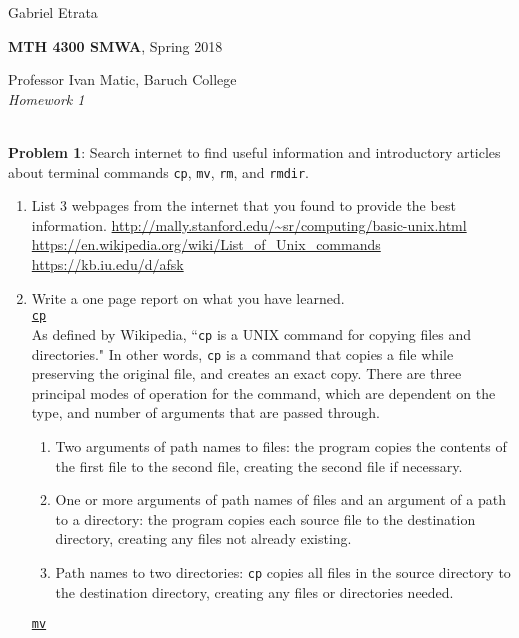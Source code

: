 \documentclass[12pt]{article}
\begin{document}
	\raggedright{Gabriel Etrata} \hfill {}\\
	\raggedright{\textbf{MTH 4300 SMWA}, Spring 2018}\\%
	\raggedright{Professor Ivan Matic, Baruch College}\\
	\textit{Homework 1} \\%
	\hrulefill\\
	\setlength\parindent{24pt} 

\textbf{Problem 1}: Search internet to find useful information and introductory articles about terminal commands \texttt{cp}, \texttt{mv}, \texttt{rm}, and \texttt{rmdir}.
 \begin{enumerate} [label=(\alph*)]
 	\item List 3 webpages from the internet that you found to provide the best information.
 	\url{http://mally.stanford.edu/~sr/computing/basic-unix.html}  \\
 	\url{https://en.wikipedia.org/wiki/List_of_Unix_commands} \\
 	\url{https://kb.iu.edu/d/afsk} \\
 	\item Write a one page report on what you have learned. \\
 	\underline{\texttt{cp}} \\
 	As defined by Wikipedia, ``\texttt{cp} is a UNIX command for copying files and directories." In other words, \texttt{cp} is a command that copies a file while preserving the original file, and creates an exact copy. There are three principal modes of operation for the command, which are dependent on the type, and number of arguments that are passed through. \\
 	\begin{enumerate}
 		\item Two arguments of path names to files: the program copies the contents of the first file to the second file, creating the second file if necessary.
 		\item One or more arguments of path names of files and an argument of a path to a directory: the program copies each source file to the destination directory, creating any files not already existing.
 		\item Path names to two directories: \texttt{cp} copies all files in the source directory to the destination directory, creating any files or directories needed.
 	\end{enumerate} 
	\underline{\texttt{mv}} \\ 	

\end{enumerate}
\end{document}
